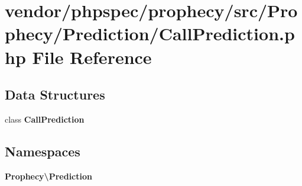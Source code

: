 \section{vendor/phpspec/prophecy/src/\+Prophecy/\+Prediction/\+Call\+Prediction.php File Reference}
\label{_call_prediction_8php}
\subsection*{Data Structures}
\begin{DoxyCompactItemize}
\item 
class {\bf Call\+Prediction}
\end{DoxyCompactItemize}
\subsection*{Namespaces}
\begin{DoxyCompactItemize}
\item 
 {\bf Prophecy\textbackslash{}\+Prediction}
\end{DoxyCompactItemize}
